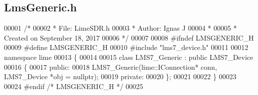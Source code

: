 \subsection{Lms\+Generic.\+h}
\label{LmsGeneric_8h_source}

\begin{DoxyCode}
00001 \textcolor{comment}{/*}
00002 \textcolor{comment}{ * File:   LimeSDR.h}
00003 \textcolor{comment}{ * Author: Ignas J}
00004 \textcolor{comment}{ *}
00005 \textcolor{comment}{ * Created on September 18, 2017}
00006 \textcolor{comment}{ */}
00007 
00008 \textcolor{preprocessor}{#ifndef LMSGENERIC\_H}
00009 \textcolor{preprocessor}{#define LMSGENERIC\_H}
00010 \textcolor{preprocessor}{#include "lms7_device.h"}
00011 
00012 \textcolor{keyword}{namespace }lime
00013 \{
00014 
00015 \textcolor{keyword}{class }LMS7_Generic : \textcolor{keyword}{public} LMS7_Device
00016 \{
00017 \textcolor{keyword}{public}:
00018     LMS7_Generic(lime::IConnection* conn, LMS7_Device *obj = \textcolor{keyword}{nullptr});
00019 \textcolor{keyword}{private}:
00020 \};
00021 
00022 \}
00023 
00024 \textcolor{preprocessor}{#endif  }\textcolor{comment}{/* LMSGENERIC\_H */}\textcolor{preprocessor}{}
00025 
\end{DoxyCode}
